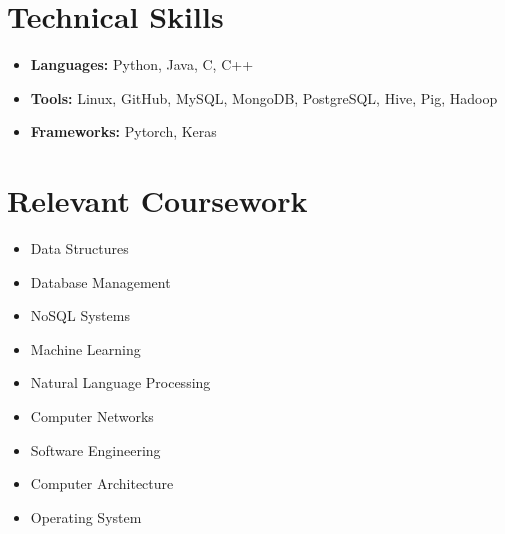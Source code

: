\documentclass[letterpaper,11pt]{article}
\makeatletter
\newcommand{\resumeItem}[1]{
  \item\small{
    {#1 \vspace{-2pt}}
  }
}
\newcommand{\resumeSubheading}[4]{
  \vspace{-2pt}\item
    \begin{tabular*}{1.0\textwidth}[t]{l@{\extracolsep{\fill}}r}
      \textbf{#1} & \textbf{\small #2} \\
      \textit{\small#3} & \textit{\small #4} \\
    \end{tabular*}\vspace{-7pt}
}
\newcommand{\resumeSubHeadingListStart}{\begin{itemize}[leftmargin=0.0in, label={}]}
\newcommand{\resumeSubHeadingListEnd}{\end{itemize}}
\newcommand{\resumeItemListStart}{\begin{itemize}}
\newcommand{\resumeItemListEnd}{\end{itemize}\vspace{-5pt}}
\makeatother
\begin{document}
%
\section{Technical Skills}
 \begin{itemize}[leftmargin=0.15in, label={},itemsep=-1pt]
     \item \small{\textbf{Languages:}{ Python, Java, C, C++ }}
     \item \small{\textbf{Tools:}{ Linux, GitHub, MySQL, MongoDB, PostgreSQL, Hive, Pig, Hadoop }}
     \item \small{\textbf{Frameworks:}{ Pytorch, Keras }}
 \end{itemize}
 \vspace{-16pt}



\section{Relevant Coursework}
        \begin{multicols}{3}
            \begin{itemize}[itemsep=-5pt, parsep=3pt]
                \item Data Structures
                \item Database Management
                \item NoSQL Systems
                \item Machine Learning
                \item Natural Language Processing
                \item Computer Networks
                \item Software Engineering
                \item Computer Architecture
                \item Operating System
            \end{itemize}
        \end{multicols}
        \vspace*{2.0\multicolsep}


        
\end{document}
